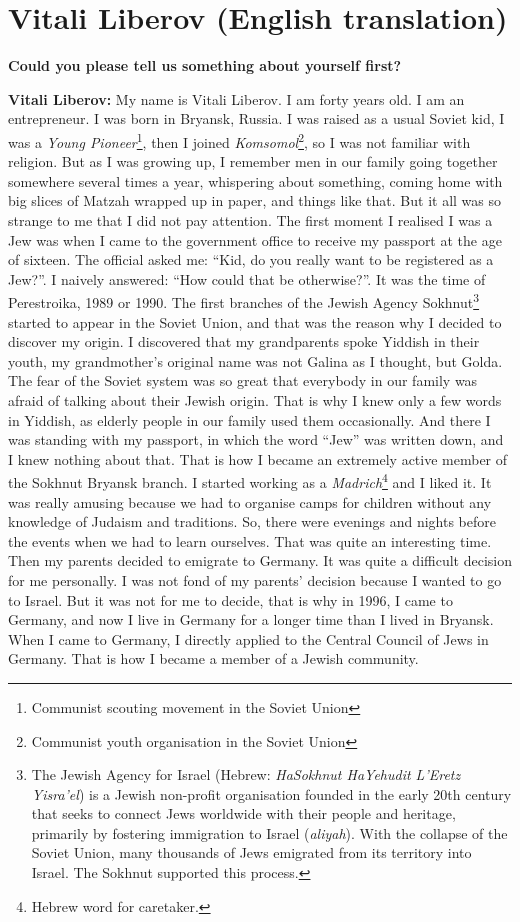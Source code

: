 \section{Vitali Liberov (English translation)}

\textbf{Could you please tell us something about yourself first?} 

\textbf{Vitali Liberov:} My name is Vitali Liberov. I am forty years old. I am an entrepreneur. I was born in Bryansk, Russia. I was raised as a usual Soviet kid, I was a \textit{Young Pioneer}\footnote{Communist scouting movement in the Soviet Union}, then I joined \textit{Komsomol}\footnote{Communist youth organisation in the Soviet Union}, so I was not familiar with religion. But as I was growing up, I remember men in our family going together somewhere several times a year, whispering about something, coming home with big slices of Matzah wrapped up in paper, and things like that. But it all was so strange to me that I did not pay attention. The first moment I realised I was a Jew was when I came to the government office to receive my passport at the age of sixteen. The official asked me: “Kid, do you really want to be registered as a Jew?”. I naively answered: “How could that be otherwise?”. It was the time of Perestroika, 1989 or 1990. The first branches of the Jewish Agency Sokhnut\footnote{The Jewish Agency for Israel (Hebrew: \textit{HaSokhnut HaYehudit L'Eretz Yisra'el}) is a Jewish non-profit organisation founded in the early 20th century that seeks to connect Jews worldwide with their people and heritage, primarily by fostering immigration to Israel (\textit{aliyah}). With the collapse of the Soviet Union, many thousands of Jews emigrated from its territory into Israel. The Sokhnut supported this process.} started to appear in the Soviet Union, and that was the reason why I decided to discover my origin. I discovered that my grandparents spoke Yiddish in their youth, my grandmother’s original name was not Galina as I thought, but Golda. The fear of the Soviet system was so great that everybody in our family was afraid of talking about their Jewish origin. That is why I knew only a few words in Yiddish, as elderly people in our family used them occasionally. And there I was standing with my passport, in which the word “Jew” was written down, and I knew nothing about that. That is how I became an extremely active member of the Sokhnut Bryansk branch. I started working as a \textit{Madrich}\footnote{Hebrew word for caretaker.} and I liked it.  It was really amusing because we had to organise camps for children without any knowledge of Judaism and traditions. So, there were evenings and nights before the events when we had to learn ourselves. That was quite an interesting time. Then my parents decided to emigrate to Germany. It was quite a difficult decision for me personally. I was not fond of my parents’ decision because I wanted to go to Israel. But it was not for me to decide, that is why in 1996, I came to Germany, and now I live in Germany for a longer time than I lived in Bryansk. When I came to Germany, I directly applied to the Central Council of Jews in Germany. That is how I became a member of a Jewish community.  

